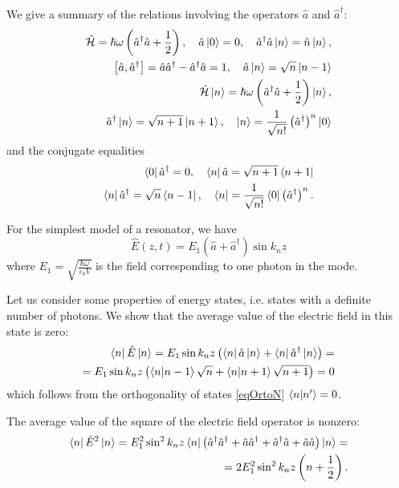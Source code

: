 We give a summary of the relations involving the operators $\hat{a}$ and $\hat{a}^{\dag}$:
\begin{eqnarray}
\hat{\mathcal{H}} = \hbar \omega \left(\hat{a}^{\dag}\hat{a} +
\frac{1}{2} \right),
\quad
\hat{a}\ket{0} = 0,
\quad
\hat{a}^{\dag}\hat{a}\ket{n} = \hat{n}\ket{n},
\nonumber \\
\left[\hat{a}, \hat{a}^{\dag}\right] = \hat{a} \hat{a}^{\dag} - \hat{a}^{\dag}
\hat{a} = 1,
\quad
\hat{a}\ket{n} = \sqrt{n}\ket{n - 1}
\nonumber \\
\hat{\mathcal{H}}\ket{n} = \hbar \omega \left(\hat{a}^{\dag}\hat{a} +
\frac{1}{2} \right)\ket{n},
\nonumber \\
\hat{a}^{\dag}\ket{n} = \sqrt{n + 1}\ket{n + 1},
\quad
\ket{n} = \frac{1}{\sqrt{n!}}\left(\hat{a}^{\dag}\right)^n\ket{0}
\end{eqnarray}
and the conjugate equalities
\begin{eqnarray}
\bra{0}\hat{a}^{\dag} = 0,
\quad
\bra{n}\hat{a} = \sqrt{n + 1}\bra{n + 1}
\nonumber \\
\bra{n}\hat{a}^{\dag} = \sqrt{n}\bra{n - 1},
\quad
\bra{n} =  \frac{1}{\sqrt{n!}} \bra{0}\left(\hat{a}^{\dag}\right)^n.
\end{eqnarray}

For the simplest model of a resonator, we have
\[
\hat{E}\left(z, t\right) = E_1\left( \hat{a} +
\hat{a}^{\dag}\right) \sin k_n z
\]
where $E_1 = \sqrt{\frac{\hbar \omega}{\varepsilon_0 V}}$ is the field
corresponding to one photon in the mode.  

Let us consider some properties of energy states, i.e. states
with a definite number of photons. We show that the average value
of the electric field in this state is zero: 
\begin{eqnarray}
\bra{n}\hat{E}\ket{n} = 
E_1 \sin k_n z \left( \bra{n}\hat{a}\ket{n} +
\bra{n}\hat{a}^{\dag}\ket{n}\right) =
\nonumber \\
= E_1 \sin k_n z \left( \bra{n}\ket{n - 1} \sqrt{n} +
\bra{n}\ket{n + 1} \sqrt{n + 1}
\right) = 0
\label{eqCh1_E_middle}
\end{eqnarray}
which follows from the orthogonality of states \eqref{eqOrtoN}
$\bra{n}\ket{n'} = 0$.

The average value of the square of the electric field operator is nonzero:
\begin{eqnarray}
\bra{n}\hat{E}^2\ket{n} = 
E_1^2 \sin^2 k_n z \bra{n}
\left(
\hat{a}^{\dag} \hat{a}^{\dag} + \hat{a} \hat{a}^{\dag} + \hat{a}^{\dag} \hat{a} +
\hat{a} \hat{a}
\right)
\ket{n} =
\nonumber \\
= 2 E_1^2 \sin^2 k_n z \left( n + \frac{1}{2}
\right).
\label{eqCh1_E2_middle}
\end{eqnarray}

